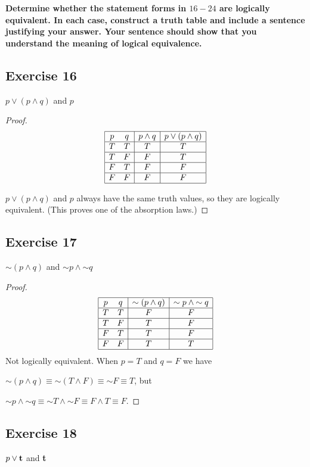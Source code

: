 \documentclass[14pt]{extarticle}
\newcommand{\true}{{\bf t}}
\begin{document}
{\bf Determine whether the statement forms in $16-24$ are logically equivalent. In each case, construct a truth table and include a sentence justifying your answer. Your sentence should show that you understand the meaning of logical equivalence.}

\subsection{Exercise 16}
$p \vee (p \wedge q)$ and $p$

\begin{proof}
$$
\begin{array}{|cc|c|c|}
\hline
p & q & p \wedge q & p \vee (p \wedge q) \\
\hline
T & T & T & T \\
\hline
T & F & F & T \\
\hline
F & T & F & F \\
\hline
F & F & F & F \\
\hline
\end{array}
$$

$p \vee (p \wedge q)$ and $p$ always have the same truth values, so they are logically equivalent. (This proves one of the absorption laws.)
\end{proof}

\subsection{Exercise 17}
${\sim(p \wedge q)}$ and ${\sim p} \wedge {\sim q}$

\begin{proof}
$$
\begin{array}{|cc|c|c|}
\hline
p & q & {\sim(p \wedge q)} & {\sim p} \wedge {\sim q} \\
\hline
T & T & F & F \\
\hline
T & F & T & F \\
\hline
F & T & T & F \\
\hline
F & F & T & T \\
\hline
\end{array}
$$
Not logically equivalent. When $p = T$ and $q = F$ we have

${\sim (p \wedge q)} \equiv {\sim (T \wedge F)} \equiv {\sim F} \equiv T$, but

${\sim p} \wedge {\sim q} \equiv {\sim T \wedge {\sim F}} \equiv F \wedge T \equiv F$.
\end{proof}

\subsection{Exercise 18}
$p \vee \true$ and \true
\end{document}
